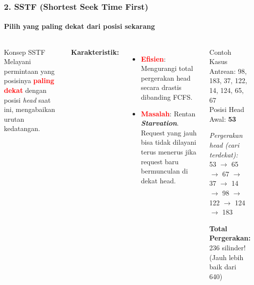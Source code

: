 \documentclass[t,aspectratio=169,xcolor=dvipsnames]{beamer}
\newcommand{\tem}[1]{\textbf{\textcolor{red}{#1}}}
\begin{document}
\begin{frame}
    \frametitle{2. SSTF (Shortest Seek Time First)}
    \framesubtitle{Pilih yang paling dekat dari posisi sekarang}
    \small
    \begin{columns}[T]
        \begin{block}{Konsep SSTF}
            Melayani permintaan yang posisinya \tem{paling dekat} dengan posisi \textit{head} saat ini, mengabaikan urutan kedatangan.
        \end{block}
        \textbf{Karakteristik:}
        \begin{itemize}
            \item \tem{Efisien}: Mengurangi total pergerakan head secara drastis dibanding FCFS.
            \item \tem{Masalah}: Rentan \textit{\textbf{Starvation}}. Request yang jauh bisa tidak dilayani terus menerus jika request baru bermunculan di dekat head.
        \end{itemize}

        \begin{exampleblock}{Contoh Kasus}
            Antrean: 98, 183, 37, 122, 14, 124, 65, 67\\
            Posisi Head Awal: \textbf{53}
            
            \vspace{0.2cm}
            \textit{Pergerakan head (cari terdekat):}\\
            53 $\to$ 65 $\to$ 67 $\to$ 37 $\to$ 14 $\to$ 98 $\to$ 122 $\to$ 124 $\to$ 183
            
            \vspace{0.2cm}
            \textbf{Total Pergerakan:} 236 silinder! (Jauh lebih baik dari 640)
        \end{exampleblock}
    \end{columns}
\end{frame}
\end{document}
